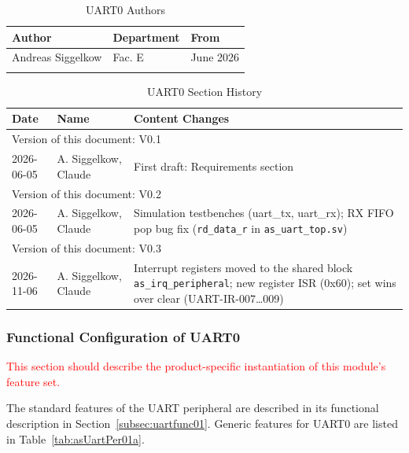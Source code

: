 \begin{table}[H]
\caption{UART0 Authors}
\label{tab:uartauth01}
\centering
\begin{tabularx}{\textwidth}{|X |X |X|}
  \hline
  Author & Department & From \\
  \hline
  \hline
  Andreas Siggelkow & Fac. E & June 2026 \\
  \hline
  & & \\
  \hline
\end{tabularx}
\end{table}

\begin{table}[H]
\caption{UART0 Section History}
\label{tab:uarthistory01}
\centering
\begin{tabularx}{\textwidth}{|X |X |X|}
  \hline
  Date & Name & Content Changes \\
  \hline
  \multicolumn{3}{|l|}{Version of this document: V0.1} \\
  \hline
  2026-06-05 & A. Siggelkow, Claude & First draft: Requirements section \\
  \hline
  \multicolumn{3}{|l|}{Version of this document: V0.2} \\
  \hline
  2026-06-05 & A. Siggelkow, Claude & Simulation testbenches (uart\_tx, uart\_rx); RX FIFO pop bug fix (\texttt{rd\_data\_r} in \texttt{as\_uart\_top.sv}) \\
  \hline
  \multicolumn{3}{|l|}{Version of this document: V0.3} \\
  \hline
  2026-11-06 & A. Siggelkow, Claude & Interrupt registers moved to the shared block \texttt{as\_irq\_peripheral}; new register ISR (0x60); set wins over clear (UART-IR-007\ldots009) \\
  \hline
\end{tabularx}
\end{table}

\subsubsection{Functional Configuration of UART0}
\textcolor{red}{This section should describe the product-specific instantiation of this module's feature set.}

The standard features of the UART peripheral are described in its functional
description in Section~\ref{subsec:uartfunc01}.
Generic features for UART0 are listed in
Table~\ref{tab:asUartPer01a}.

